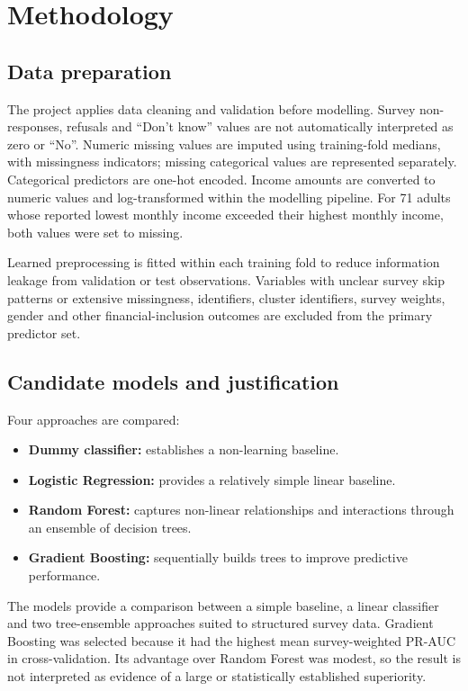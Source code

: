 \documentclass[11pt,a4paper]{article}
\begin{document}
\section{Methodology}

\subsection{Data preparation}

The project applies data cleaning and validation before modelling. Survey non-responses, refusals and ``Don't know'' values are not automatically interpreted as zero or ``No''. Numeric missing values are imputed using training-fold medians, with missingness indicators; missing categorical values are represented separately. Categorical predictors are one-hot encoded. Income amounts are converted to numeric values and log-transformed within the modelling pipeline. For 71 adults whose reported lowest monthly income exceeded their highest monthly income, both values were set to missing.

Learned preprocessing is fitted within each training fold to reduce information leakage from validation or test observations. Variables with unclear survey skip patterns or extensive missingness, identifiers, cluster identifiers, survey weights, gender and other financial-inclusion outcomes are excluded from the primary predictor set.

\subsection{Candidate models and justification}

Four approaches are compared:
\begin{itemize}[leftmargin=*]
  \item \textbf{Dummy classifier:} establishes a non-learning baseline.
  \item \textbf{Logistic Regression:} provides a relatively simple linear baseline.
  \item \textbf{Random Forest:} captures non-linear relationships and interactions through an ensemble of decision trees.
  \item \textbf{Gradient Boosting:} sequentially builds trees to improve predictive performance.
\end{itemize}
The models provide a comparison between a simple baseline, a linear classifier and two tree-ensemble approaches suited to structured survey data. Gradient Boosting was selected because it had the highest mean survey-weighted PR-AUC in cross-validation. Its advantage over Random Forest was modest, so the result is not interpreted as evidence of a large or statistically established superiority.
\end{document}
